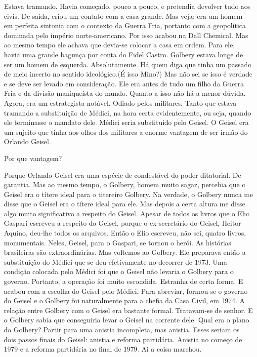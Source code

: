 \falaM Estava tramando. Havia começado, pouco a pouco, e pretendia devolver
tudo aos civis. De saída, criou um contato com a casa-grande. Mas veja:
era um homem em perfeita sintonia com o contexto da Guerra Fria,
portanto com a geopolítica dominada pelo império norte-americano. Por
isso acabou na Dall Chemical. Mas ao mesmo tempo ele achava que devia-se
colocar a casa em ordem. Para ele, havia uma grande bagunça por conta do
Fidel Castro. Golbery estava longe de ser um homem de esquerda.
Absolutamente. Há quem diga que tinha um passado de meio incerto no
sentido ideológico.(É isso Mino?) Mas não sei se isso é verdade e se
deve ser levado em consideração. Ele era antes de tudo um filho da
Guerra Fria e da divisão maniqueísta do mundo. Quanto a isso não há a
menor dúvida. Agora, era um estrategista notável. Odiado pelos
militares. Tanto que estava tramando a substituição de Médici, na hora
certa evidentemente, ou seja, quando ele terminasse o mandato dele.
Médici seria substituído pelo Geisel. O Geisel era um sujeito que tinha
aos olhos dos militares a enorme vantagem de ser irmão do Orlando
Geisel.

\falaG Por que vantagem?

\falaM Porque Orlando Geisel era uma espécie de condestável do poder
ditatorial. De garantia. Mas ao mesmo tempo, o Golbery, homem muito
sagaz, percebia que o Geisel era o títere ideal para o titereiro
Golbery. Na verdade, o Golbery nunca me disse que o Geisel era o títere
ideal para ele. Mas depois a certa altura me disse algo muito
significativo a respeito do Geisel. Apesar de todos os livros que o Elio
Gaspari escreveu a respeito do Geisel, porque o ex-secretário do Geisel,
Heitor Aquino, deu-lhe todos os arquivos. Então o Elio escreveu, não
sei, quatro livros, monumentais. Neles, Geisel, para o Gaspari, se
tornou o herói. As histórias brasileiras são extraordinárias. Mas
voltemos ao Golbery. Ele preparava então a substituição do Médici que se
deu efetivamente no decorrer de 1973. Uma condição colocada pelo Médici
foi que o Geisel não levaria o Golbery para o governo. Portanto, a
operação foi muito escondida. Estranha de certa forma. E acabou com a
escolha do Geisel pelo Médici. Para abreviar, formou-se o governo do
Geisel e o Golbery foi naturalmente para a chefia da Casa Civil, em
1974. A relação entre Golbery com o Geisel era bastante formal.
Tratavam-se de senhor. E o Golbery sabia que conseguiria levar o Geisel
na corrente dele. Qual era o plano do Golbery? Partir para uma anistia
incompleta, mas anistia. Esses seriam os dois passos finais do Geisel:
anistia e reforma partidária. Anistia no começo de 1979 e a reforma
partidária no final de 1979. Ai a coisa marchou.

